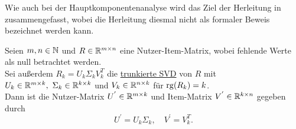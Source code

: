 Wie auch bei der Hauptkomponentenanalyse wird das Ziel der Herleitung in  zusammengefasst, wobei die Herleitung diesmal nicht als formaler Beweis bezeichnet werden kann.
\begin{application}[PureSVD]\label{app:pure}
    Seien \(m,n \in \mathbb{N}\) und \(R \in \mathbb{R}^{m \times n}\) eine Nutzer-Item-Matrix, wobei fehlende Werte als null betrachtet werden. \\
    Sei außerdem \(R_{k} = U_{k} \Sigma_{k} V_{k}^{T}\) die \hyperref[df:trunsvd]{trunkierte SVD} von \(R\) mit \(U_{k} \in \mathbb{R}^{m \times k},\ \Sigma_{k} \in \mathbb{R}^{k \times k}\) und \(V_{k} \in \mathbb{R}^{n \times k}\) für \(\operatorname{rg}(R_{k}) = k\). \\
    Dann ist die Nutzer-Matrix \(U^{'} \in \mathbb{R}^{m \times k}\) und Item-Matrix \(V^{'} \in \mathbb{R}^{k \times n}\) gegeben durch
    \begin{equation*}
        U^{'} = U_{k} \Sigma_{k}, \quad V^{'} = V^{T}_{k}.
    \end{equation*}  
\end{application} 
